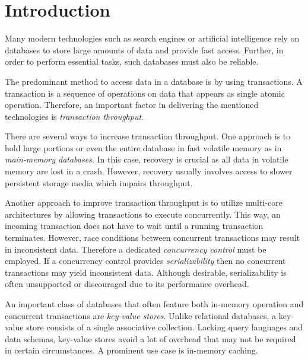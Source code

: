 \chapter{Introduction}
\label{ch:intro}



Many modern technologies such as search engines or artificial intelligence rely
on databases to store large amounts of data and provide fast access. Further, in
order to perform essential tasks, such databases must also be reliable.

The predominant method to access data in a database is by using transactions. A
transaction is a sequence of operations on data that appears as single atomic
operation. Therefore, an important factor in delivering the mentioned
technologies is \textit{transaction throughput}.

There are several ways to increase transaction throughput. One approach is to
hold large portions or even the entire database in fast volatile memory as in
\textit{main-memory databases}. In this case, recovery is crucial as all data in
volatile memory are lost in a crash. However, recovery usually involves access
to slower persistent storage media which impairs throughput.

Another approach to improve transaction throughput is to utilize multi-core
architectures by allowing transactions to execute concurrently. This way, an
incoming transaction does not have to wait until a running transaction
terminates. However, race conditions between concurrent transactions may result
in inconsistent data. Therefore a dedicated \textit{concurrency control} must be
employed. If a concurrency control provides \textit{serializability} then no
concurrent transactions may yield inconsistent data. Although desirable,
serializability is often unsupported or discouraged due to its performance
overhead.

An important class of databases that often feature both in-memory operation and
concurrent transactions are \textit{key-value stores}. Unlike relational
databases, a key-value store consists of a single associative collection.
Lacking query languages and data schemas, key-value stores avoid a lot of
overhead that may not be required in certain circumstances. A prominent use case
is in-memory caching.

